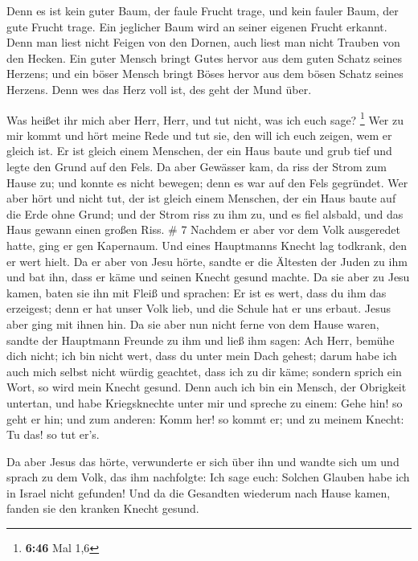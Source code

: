  Denn es ist kein guter Baum, der faule Frucht trage, und
kein fauler Baum, der gute Frucht trage.  Ein jeglicher
Baum wird an seiner eigenen Frucht erkannt. Denn man liest nicht Feigen
von den Dornen, auch liest man nicht Trauben von den Hecken.
 Ein guter Mensch bringt Gutes hervor aus dem guten
Schatz seines Herzens; und ein böser Mensch bringt Böses hervor aus dem
bösen Schatz seines Herzens. Denn wes das Herz voll ist, des geht der
Mund über.

 Was heißet ihr mich aber Herr, Herr, und tut nicht, was
ich euch sage? \footnote{\textbf{6:46} Mal 1,6}  Wer zu
mir kommt und hört meine Rede und tut sie, den will ich euch zeigen, wem
er gleich ist.  Er ist gleich einem Menschen, der ein
Haus baute und grub tief und legte den Grund auf den Fels. Da aber
Gewässer kam, da riss der Strom zum Hause zu; und konnte es nicht
bewegen; denn es war auf den Fels gegründet.  Wer aber
hört und nicht tut, der ist gleich einem Menschen, der ein Haus baute
auf die Erde ohne Grund; und der Strom riss zu ihm zu, und es fiel
alsbald, und das Haus gewann einen großen Riss. \# 7 
Nachdem er aber vor dem Volk ausgeredet hatte, ging er gen Kapernaum.
 Und eines Hauptmanns Knecht lag todkrank, den er wert
hielt.  Da er aber von Jesu hörte, sandte er die Ältesten
der Juden zu ihm und bat ihn, dass er käme und seinen Knecht gesund
machte.  Da sie aber zu Jesu kamen, baten sie ihn mit
Fleiß und sprachen: Er ist es wert, dass du ihm das erzeigest;
 denn er hat unser Volk lieb, und die Schule hat er uns
erbaut.  Jesus aber ging mit ihnen hin. Da sie aber nun
nicht ferne von dem Hause waren, sandte der Hauptmann Freunde zu ihm und
ließ ihm sagen: Ach Herr, bemühe dich nicht; ich bin nicht wert, dass du
unter mein Dach gehest;  darum habe ich auch mich selbst
nicht würdig geachtet, dass ich zu dir käme; sondern sprich ein Wort, so
wird mein Knecht gesund.  Denn auch ich bin ein Mensch,
der Obrigkeit untertan, und habe Kriegsknechte unter mir und spreche zu
einem: Gehe hin! so geht er hin; und zum anderen: Komm her! so kommt er;
und zu meinem Knecht: Tu das! so tut er's.

 Da aber Jesus das hörte, verwunderte er sich über ihn und
wandte sich um und sprach zu dem Volk, das ihm nachfolgte: Ich sage
euch: Solchen Glauben habe ich in Israel nicht gefunden! 
Und da die Gesandten wiederum nach Hause kamen, fanden sie den kranken
Knecht gesund.


